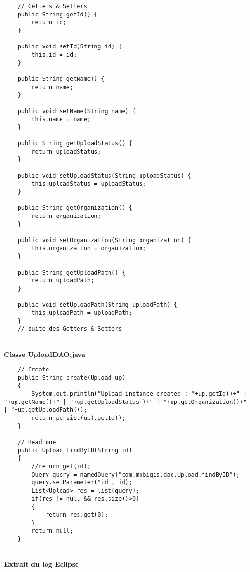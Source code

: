 \begin{itemsize}
\begin{lstlisting}
    // Getters & Setters
    public String getId() {
        return id;
    }

    public void setId(String id) {
        this.id = id;
    }
    
    public String getName() {
        return name;
    }

    public void setName(String name) {
        this.name = name;
    }

    public String getUploadStatus() {
        return uploadStatus;
    }

    public void setUploadStatus(String uploadStatus) {
        this.uploadStatus = uploadStatus;
    }

    public String getOrganization() {
        return organization;
    }

    public void setOrganization(String organization) {
        this.organization = organization;
    }

    public String getUploadPath() {
        return uploadPath;
    }

    public void setUploadPath(String uploadPath) {
        this.uploadPath = uploadPath;
    }
	// suite des Getters & Setters
\end{lstlisting} \\

\textbf{Classe UploadDAO.java}\\

\begin{lstlisting}
	// Create 
    public String create(Upload up)
    {
        System.out.println("Upload instance created : "+up.getId()+" | "+up.getName()+" | "+up.getUploadStatus()+" | "+up.getOrganization()+" | "+up.getUploadPath());
        return persist(up).getId();
    }

    // Read one
    public Upload findByID(String id)
    {
        //return get(id);
        Query query = namedQuery("com.mobigis.dao.Upload.findByID");
        query.setParameter("id", id);
        List<Upload> res = list(query);
        if(res != null && res.size()>0)
        {
            return res.get(0);
        }
        return null;
    }
\end{lstlisting} \\


\textbf{Extrait du log Eclipse}\\


\end{itemsize}

